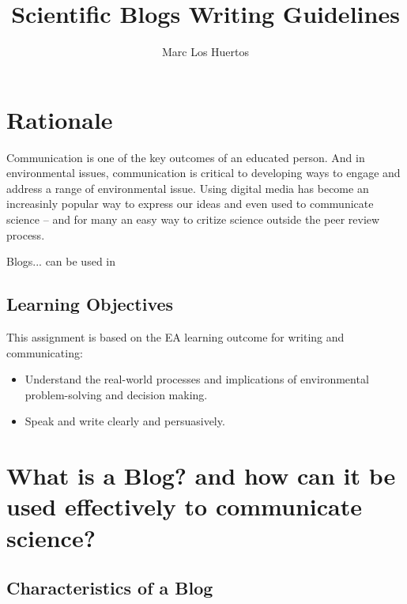 \documentclass{tufte-handout}\usepackage[]{graphicx}\usepackage[]{color}
\title{Scientific Blogs Writing Guidelines %
}
\author[Marc Los Huertos]{Marc Los Huertos}
\begin{document}
\maketitle

\section{Rationale}

Communication is one of the key outcomes of an educated person. And in environmental issues, communication is critical to developing ways to engage and address a range of environmental issue. Using digital media has become an increasinly popular way to express our ideas and even used to communicate science -- and for many an easy way to critize science outside the peer review process. 

Blogs... can be used in 

\subsection{Learning Objectives}

This assignment is based on the EA learning outcome for writing and communicating: 

\begin{itemize}
	\item Understand the real-world processes and implications of environmental problem-solving and decision making.
	\item Speak and write clearly and persuasively.
\end{itemize}

\section{What is a Blog? and how can it be used effectively to communicate science?}



\subsection{Characteristics of a Blog}
\end{document}
